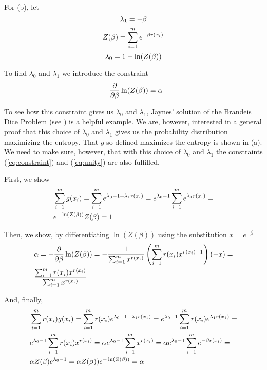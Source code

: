 For (b), let
\begin{equation}
  \label{eq:l1}
\lambda_{1}=-\beta\notag
\end{equation}
\begin{equation}
  \label{eq:zet}
Z(\beta)=\sum_{i=1}^{m}e^{-\beta{}r(x_{i})}\notag
\end{equation}
\begin{equation}
  \label{eq:l0}
\lambda_{0}=1-\ln(Z(\beta))\notag
\end{equation}

To find $\lambda_{0}$ and $\lambda_{1}$ we introduce the constraint
\begin{equation}
  \label{eq:logcon}
-\frac{\partial}{\partial{}\beta}\ln(Z(\beta))=\alpha\notag
\end{equation}

To see how this constraint gives us $\lambda_{0}$ and $\lambda_{1}$,
Jaynes' solution of the Brandeis Dice Problem (see
) is a helpful example. We are, however,
interested in a general proof that this choice of $\lambda_{0}$ and
$\lambda_{1}$ gives us the probability distribution maximizing the
entropy. That $g$ so defined maximizes the entropy is shown in (a). We
need to make sure, however, that with this choice of $\lambda_{0}$ and
$\lambda_{1}$ the constraints ({\ref{eq:constraint}}) and
({\ref{eq:unity}}) are also fulfilled.

First, we show
\begin{align}
&\sum_{i=1}^{m}g(x_{i})=\sum_{i=1}^{m}e^{\lambda_{0}-1+\lambda_{1}r(x_{i})}=e^{\lambda_{0}-1}\sum_{i=1}^{m}e^{\lambda_{1}r(x_{i})}=\notag\\
&e^{-\ln(Z(\beta))}Z(\beta)=1\label{eq:unishow}\notag
\end{align}

Then, we show, by differentiating $\ln(Z(\beta))$ using the
substitution $x=e^{-\beta}$
\begin{align}
&\alpha=-\frac{\partial}{\partial{}\beta}\ln(Z(\beta))=-\frac{1}{\sum_{i=1}^{m}x^{r(x_{i})}}\left(\sum_{i=1}^{m}r(x_{i})x^{r(x_{i})-1}\right)(-x)=\notag\\
&\frac{\sum_{i=1}^{m}r(x_{i})x^{r(x_{i})}}{\sum_{i=1}^{m}x^{r(x_{i})}}\notag
\end{align}

And, finally,
\begin{align}
&\sum_{i=1}^{m}r(x_{i})g(x_{i})=\sum_{i=1}^{m}r(x_{i})e^{\lambda_{0}-1+\lambda_{1}r(x_{1})}=e^{\lambda_{0}-1}\sum_{i=1}^{m}r(x_{i})e^{\lambda_{1}r(x_{1})}=\notag\\
&e^{\lambda_{0}-1}\sum_{i=1}^{m}r(x_{i})x^{r(x_{i})}=\alpha{}e^{\lambda_{0}-1}\sum_{i=1}^{m}x^{r(x_{i})}=\alpha{}e^{\lambda_{0}-1}\sum_{i=1}^{m}e^{-\beta{}r(x_{i})}=\notag\\
&\alpha{}Z(\beta)e^{\lambda_{0}-1}=\alpha{}Z(\beta))e^{-\ln(Z(\beta))}=\alpha\notag
\end{align}

